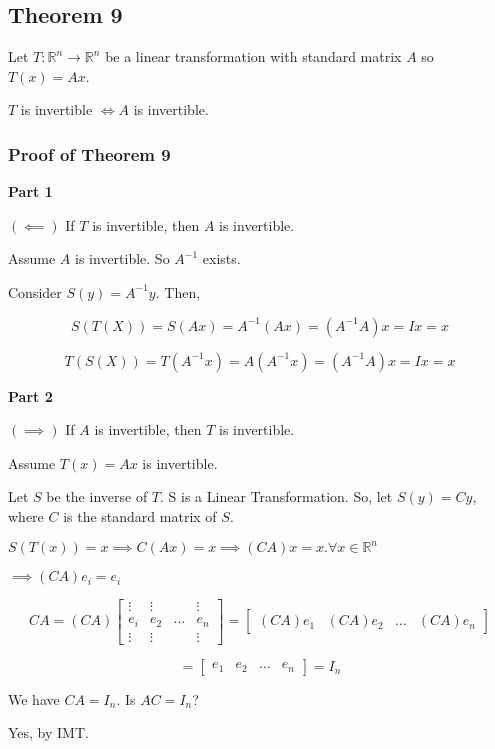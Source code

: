 \documentclass[12pt]{article}
\begin{document}
\subsection*{Theorem 9}

Let $T: \mathbb{R}^n \to \mathbb{R}^n$ be a linear transformation with standard
matrix $A$ so $T(x) = Ax$.

$T$ is invertible $\iff A$ is invertible.

\subsubsection*{Proof of Theorem 9}

\noindent

\textbf{Part 1}

$(\impliedby)$ If $T$ is invertible, then $A$ is invertible.

Assume $A$ is invertible. So $A^{-1}$ exists.

Consider $S(y) = A^{-1}y$. Then, 

\begin{equation}
  S(T(X)) = S(Ax) = A^{-1}(Ax) = (A^{-1}A)x = Ix = x
\end{equation}

\begin{equation}
  T(S(X)) = T(A^{-1}x) =  A(A^{-1}x) = (A^{-1}A)x = Ix = x
\end{equation}

\textbf{Part 2}

$(\implies)$ If $A$ is invertible, then $T$ is invertible.

Assume $T(x) = Ax$ is invertible.

Let $S$ be the inverse of $T$. S is a Linear Transformation. So, let $S(y) = Cy$,
where $C$ is the standard matrix of $S$.

$S(T(x)) = x \implies C(Ax) = x \implies (CA) x = x. \forall x \in \mathbb{R}^n$

$\implies (CA)e_i=e_i$

\[
  CA = 
  (CA)
  \begin{bmatrix}
    \vdots & \vdots & & \vdots\\
    e_i & e_2 & \dots & e_n\\
    \vdots & \vdots & & \vdots
  \end{bmatrix}
  = \begin{bmatrix}
    (CA)e_1 & (CA)e_2 & \dots & (CA)e_n
  \end{bmatrix} 
\]


\[
  = \begin{bmatrix}
    e_1 & e_2 & \dots & e_n
  \end{bmatrix}
  = I_n
\]

We have $CA=I_n$. Is $AC=I_n$?

Yes, by IMT.
\end{document}
